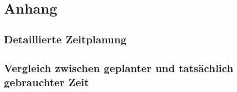 \section{Anhang}
\subsection{Detaillierte Zeitplanung}
\label{app:Zeitplanung}


\subsection{Vergleich zwischen geplanter und tatsächlich gebrauchter Zeit}
\label{app:ZeitplanungReal}

\clearpage









